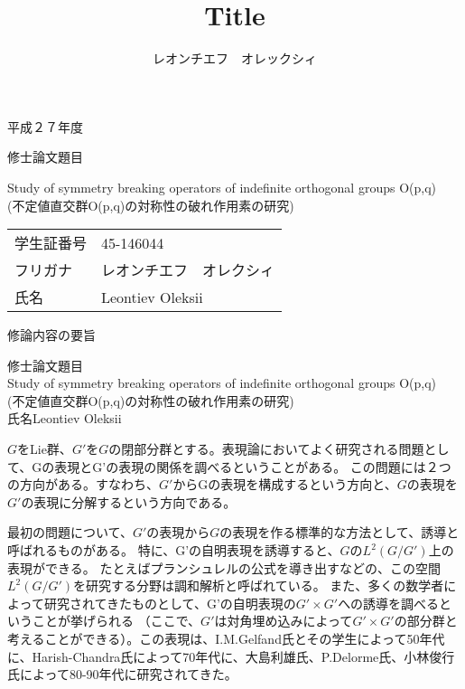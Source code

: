 \documentclass[a4paper,10pt]{article} %
\title{Title}
\author{レオンチエフ　オレックシィ}
\begin{document}
\begin{titlepage}
{\huge\begin{spacing}{1.2}
\begin{center}
	平成２７年度
	\end{center}
	\vspace{2cm}
	修士論文題目
	\begin{center}
	{\Huge Study of symmetry breaking operators of indefinite orthogonal groups O(p,q)}\\
	(不定値直交群O(p,q)の対称性の破れ作用素の研究)\\
\vspace{6cm}
\begin{tabular}{ll}
学生証番号&45-146044\\
フリガナ & レオンチエフ　オレクシィ\\
氏名&Leontiev Oleksii
\end{tabular}
	\end{center}
\end{spacing}
}
\end{titlepage}
\begin{spacing}{1.5}
\begin{center} 修論内容の要旨\end{center}
\noindent 修士論文題目\\ 
Study of symmetry breaking operators of indefinite orthogonal groups O(p,q)\\
(不定値直交群O(p,q)の対称性の破れ作用素の研究)\\
氏名\quad Leontiev Oleksii
\end{spacing}\vspace{0.5cm}

$G$をLie群、$G'$を$G$の閉部分群とする。表現論においてよく研究される問題として、Gの表現とG’の表現の関係を調べるということがある。
この問題には２つの方向がある。すなわち、$G'$からGの表現を構成するという方向と、$G$の表現を$G'$の表現に分解するという方向である。\par
最初の問題について、$G'$の表現から$G$の表現を作る標準的な方法として、誘導と呼ばれるものがある。
特に、G’の自明表現を誘導すると、$G$の$L^2(G/G')$上の表現ができる。
たとえばプランシュレルの公式を導き出すなどの、この空間$L^2(G/G')$を研究する分野は調和解析と呼ばれている。
また、多くの数学者によって研究されてきたものとして、G’の自明表現の$G'\times G'$への誘導を調べるということが挙げられる
（ここで、$G'$は対角埋め込みによって$G'\times G'$の部分群と考えることができる）。この表現は、I.M.Gelfand氏とその学生によって50年代に、Harish-Chandra氏によって70年代に、大島利雄氏、P.Delorme氏、小林俊行氏によって80-90年代に研究されてきた。
\end{document}
